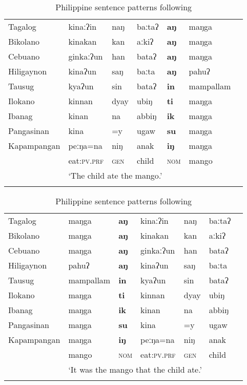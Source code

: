 \documentclass[output=paper]{langsci/langscibook}
\begin{document}
\begin{table}[t]
\begin{tabularx}{\textwidth}{Xllllll}\lsptoprule
		 {Tagalog} & kinaːʔin & naŋ &baːtaʔ & \textbf{aŋ} & maŋga\\
		 {Bikolano} & kinakan& kan& aːkiʔ &\textbf{aŋ} &maŋga\\
		 {Cebuano} & ginkaːʔun& han& bataʔ& \textbf{aŋ} &maŋga\\
		 {Hiligaynon} & kinaʔun& saŋ& baːta & \textbf{aŋ}& pahuʔ\\
		 {Tausug} & kyaʔun& sin& bataʔ& \textbf{in}&mampallam\\
		 {Ilokano} & kinnan& dyay&ubiŋ& \textbf{ti} &maŋga\\
		 {Ibanag}& kinan& na& abbiŋ& \textbf{ik}&maŋga\\
		 {Pangasinan}& kina& =y & ugaw& \textbf{su}& maŋga\\
		 {Kapampangan}& peːŋa=na& niŋ& anak& \textbf{iŋ}&maŋga\\\midrule
		& eat:\textsc{pv.prf} & \textsc{gen} & child& \textsc{nom}& mango \\
		&\multicolumn{5}{l}{`The child ate the mango.'\quad}\\\lspbottomrule
\end{tabularx}\caption{\label{tab:kaufman:1}Philippine sentence patterns following \citet{Constantino:1965}}\bigskip
\end{table}

\begin{table}[t]
\begin{tabularx}{\textwidth}{Xllllll}\lsptoprule
		 {Tagalog} & maŋga & \textbf{aŋ} & kinaːʔin & naŋ &baːtaʔ\\
		 {Bikolano} &maŋga &\textbf{aŋ}& kinakan& kan& aːkiʔ\\
		 {Cebuano} &maŋga& \textbf{aŋ}& ginkaːʔun& han& bataʔ\\
		 {Hiligaynon} & pahuʔ& \textbf{aŋ}& kinaʔun& saŋ& baːta\\
		 {Tausug} &mampallam& \textbf{in}& kyaʔun& sin& bataʔ\\
		 {Ilokano} &maŋga& \textbf{ti}& kinnan& dyay& ubiŋ\\
		 {Ibanag}&maŋga& \textbf{ik}& kinan& na& abbiŋ\\
		 {Pangasinan}& maŋga& \textbf{su}& kina& =y& ugaw\\
		 {Kapampangan}&maŋga& \textbf{iŋ}& peːŋa=na& niŋ& anak\\\midrule
		& mango & \textsc{nom} & eat:\textsc{pv.prf} & \textsc{gen} & child\\
		&\multicolumn{5}{l}{`It was the mango that the child ate.'\quad}\\\lspbottomrule
\end{tabularx}\caption{\label{tab:kaufman:2}Philippine sentence patterns following \citet{Constantino:1965}}
\end{table}
\end{document}
